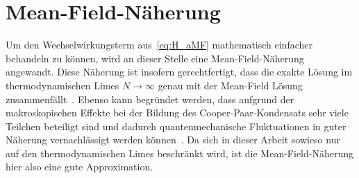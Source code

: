 















\section{Mean-Field-Näherung}



Um den Wechselwirkungsterm aus~\eqref{eq:H_aMF} mathematisch einfacher behandeln zu können, wird an dieser Stelle eine Mean-Field-Näherung angewandt. 
Diese Näherung ist insofern gerechtfertigt, dass die exakte Lösung im thermodynamischen Limes $N \rightarrow \infty$ genau mit der Mean-Field Lösung zusammenfällt~\cite{bogolyubov_asymptotically_1961,roman_large-n_2002}.
Ebenso kann begründet werden, dass aufgrund der makroskopischen Effekte bei der Bildung des Cooper-Paar-Kondensats sehr viele Teilchen beteiligt sind und dadurch quantenmechanische Fluktuationen in guter Näherung vernachlässigt werden können~\cite[50]{tinkham_introduction_2004}.
Da sich in dieser Arbeit sowieso nur auf den thermodynamischen Limes beschränkt wird, ist die Mean-Field-Näherung hier also eine gute Approximation.



